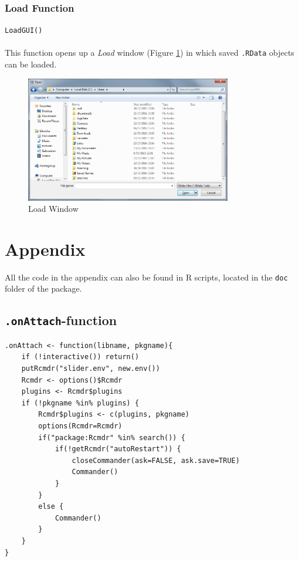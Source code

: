 \documentclass[a4paper]{article}\usepackage[]{graphicx}\usepackage[]{color}
\begin{document}
\subsubsection{Load Function}
\texttt{LoadGUI()}\\ \\
This function opens up a {\it Load} window (Figure \ref{loadGUI}) in which saved
\verb|.RData| objects can be loaded.

\begin{figure}[H]
\centering
\includegraphics[width=9cm]{figures/loadGUI.png}
\caption{Load Window \label{loadGUI}}
\end{figure}

\newpage
\nocite{*}





\newpage
\section{Appendix}
\noindent All the code in the appendix can also be found in R scripts, located
in the \verb|doc| folder of the package.
\subsection{\texttt{.onAttach}-function}
\begin{verbatim}
.onAttach <- function(libname, pkgname){
    if (!interactive()) return()
    putRcmdr("slider.env", new.env())    
    Rcmdr <- options()$Rcmdr
    plugins <- Rcmdr$plugins
    if (!pkgname %in% plugins) {
        Rcmdr$plugins <- c(plugins, pkgname)
        options(Rcmdr=Rcmdr)
        if("package:Rcmdr" %in% search()) {
            if(!getRcmdr("autoRestart")) {
                closeCommander(ask=FALSE, ask.save=TRUE)
                Commander()
            }
        }
        else {
            Commander()
        }
    }
}

\end{verbatim}
\end{document}
